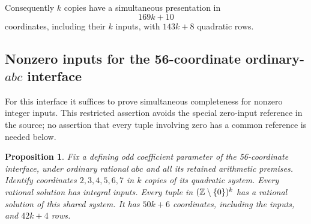 \documentclass[11pt]{article}
\newtheorem{proposition}[theorem]{Proposition}
\begin{document}
Consequently \(k\) copies have a simultaneous presentation in
\[
                       169k+10
\]
coordinates, including their \(k\) inputs, with \(143k+8\) quadratic rows.

\subsection{Nonzero inputs for the 56-coordinate ordinary-\(abc\) interface}
For this interface it suffices to prove simultaneous completeness for
nonzero integer inputs. This restricted assertion avoids the special
zero-input reference in the source; no assertion that every tuple involving
zero has a common reference is needed below.

\begin{proposition}\label{prop:abc-common-reference}
Fix a defining odd coefficient parameter of the 56-coordinate interface,
under ordinary rational \(abc\) and all its retained arithmetic premises.
Identify coordinates \(2,3,4,5,6,7\) in \(k\) copies of its quadratic
system. Every rational solution has integral inputs. Every tuple in
\((\mathbb Z\setminus\{0\})^k\) has a rational solution of this shared system.
It has \(50k+6\) coordinates, including the inputs, and \(42k+4\) rows.
\end{proposition}
\end{document}
